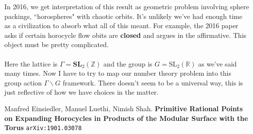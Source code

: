 \documentclass[12pt]{article}
\begin{document}
{In 2016, we get interpretation of this result as geometric problem involving sphere packings, ``horospheres" with chaotic orbits.  It's unlikely we've had enough time as a civilization to absorb what all of this meant.  For example, the 2016 paper asks if certain horocycle flow obits are \textbf{closed} and argues in the affirmative.  This object must be pretty complicated.\\ \\
Here the lattice is $\Gamma = \textbf{SL}_2 (\mathbb{Z})$ 
and the group is $G = \text{SL}_2(\mathbb{R})$ as we've said many times.  Now I have to try to map our number theory problem into this group action $\Gamma \backslash G$ framework.  There doesn't seem to be a universal way, this is just reflective of how we have choices in the matter.
}
\vfill

\begin{thebibliography}{}

\item Manfred Einsiedler, Manuel Luethi, Nimish Shah. \textbf{Primitive Rational Points on Expanding Horocycles in Products of the Modular Surface with the Torus} \texttt{arXiv:1901.03078}

\item 

\end{thebibliography}
\end{document}
